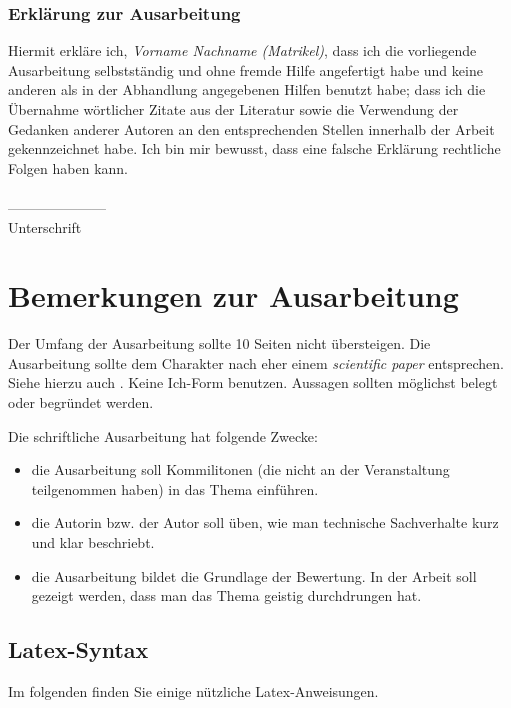 \documentclass[fleqn,10pt,ngerman]{SelfArx}
\begin{document}





\subsubsection*{Erklärung zur Ausarbeitung}
Hiermit erkläre ich, {\it Vorname Nachname (Matrikel)}, dass ich die vorliegende Ausarbeitung selbstständig und ohne fremde Hilfe angefertigt habe und keine anderen als in der Abhandlung angegebenen Hilfen benutzt habe; dass ich die Übernahme wörtlicher Zitate aus der Literatur sowie die Verwendung der Gedanken anderer Autoren an den entsprechenden Stellen innerhalb der Arbeit gekennzeichnet habe. Ich bin mir bewusst, dass eine falsche Erklärung rechtliche Folgen haben kann.\\ \\
--------------------- \\
Unterschrift


\clearpage
\newpage
\appendix
\section{Bemerkungen zur Ausarbeitung}
Der Umfang der Ausarbeitung sollte 10 Seiten nicht übersteigen. Die Ausarbeitung sollte dem Charakter nach eher einem {\it scientific paper} entsprechen. Siehe hierzu auch  \cite{Rechenberg}. Keine Ich-Form benutzen. Aussagen sollten möglichst belegt oder begründet werden.

Die schriftliche Ausarbeitung hat folgende Zwecke:
\begin{itemize}[noitemsep]
\item die Ausarbeitung soll Kommilitonen (die nicht an der Veranstaltung teilgenommen haben) in das Thema ein\-führen.
\item die Autorin bzw. der Autor soll üben, wie man technische Sachverhalte kurz und klar beschriebt.
\item die Ausarbeitung bildet die Grundlage der Bewertung. In der Arbeit soll
gezeigt werden, dass man das Thema geistig durchdrungen hat.
\end{itemize}


\subsection{Latex-Syntax}
Im folgenden finden Sie einige nützliche Latex-Anweisungen.
\end{document}
